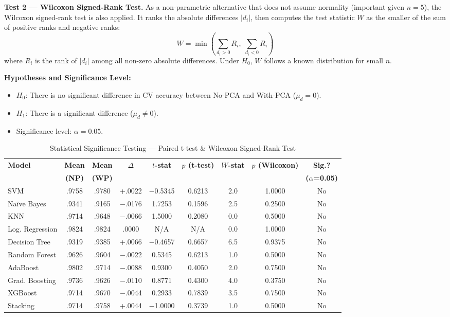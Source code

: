 \documentclass[12pt,a4paper]{article}
\begin{document}
\textbf{Test 2 --- Wilcoxon Signed-Rank Test.}
As a non-parametric alternative that does not assume normality (important given $n = 5$), the Wilcoxon signed-rank test is also applied. It ranks the absolute differences $|d_i|$, then computes the test statistic $W$ as the smaller of the sum of positive ranks and negative ranks:
\begin{equation}
W = \min\!\left(\sum_{d_i > 0} R_i, \;\sum_{d_i < 0} R_i\right)
\end{equation}
where $R_i$ is the rank of $|d_i|$ among all non-zero absolute differences. Under $H_0$, $W$ follows a known distribution for small $n$.

\textbf{Hypotheses and Significance Level:}
\begin{itemize}
    \item $H_0$: There is no significant difference in CV accuracy between No-PCA and With-PCA ($\mu_d = 0$).
    \item $H_1$: There is a significant difference ($\mu_d \neq 0$).
    \item Significance level: $\alpha = 0.05$.
\end{itemize}

\begin{table}[H]
\centering
\caption{Statistical Significance Testing — Paired t-test \& Wilcoxon Signed-Rank Test}
\label{tab:stat_sig}
\vspace{0.2cm}
\small
\begin{tabular}{l|cc|c|cc|cc|c}
\toprule
\textbf{Model} & \textbf{Mean} & \textbf{Mean} & \textbf{$\Delta$} & \textbf{$t$-stat} & \textbf{$p$ (t-test)} & \textbf{$W$-stat} & \textbf{$p$ (Wilcoxon)} & \textbf{Sig.?} \\
 & \textbf{(NP)} & \textbf{(WP)} & & & & & & \textbf{($\alpha$=0.05)} \\
\midrule
SVM & .9758 & .9780 & +.0022 & $-$0.5345 & 0.6213 & 2.0 & 1.0000 & No \\
Na\"ive Bayes & .9341 & .9165 & $-$.0176 & 1.7253 & 0.1596 & 2.5 & 0.2500 & No \\
KNN & .9714 & .9648 & $-$.0066 & 1.5000 & 0.2080 & 0.0 & 0.5000 & No \\
Log. Regression & .9824 & .9824 & .0000 & N/A & N/A & 0.0 & 1.0000 & No \\
Decision Tree & .9319 & .9385 & +.0066 & $-$0.4657 & 0.6657 & 6.5 & 0.9375 & No \\
Random Forest & .9626 & .9604 & $-$.0022 & 0.5345 & 0.6213 & 1.0 & 0.5000 & No \\
AdaBoost & .9802 & .9714 & $-$.0088 & 0.9300 & 0.4050 & 2.0 & 0.7500 & No \\
Grad. Boosting & .9736 & .9626 & $-$.0110 & 0.8771 & 0.4300 & 4.0 & 0.3750 & No \\
XGBoost & .9714 & .9670 & $-$.0044 & 0.2933 & 0.7839 & 3.5 & 0.7500 & No \\
Stacking & .9714 & .9758 & +.0044 & $-$1.0000 & 0.3739 & 1.0 & 0.5000 & No \\
\bottomrule
\end{tabular}
\end{table}
\end{document}
